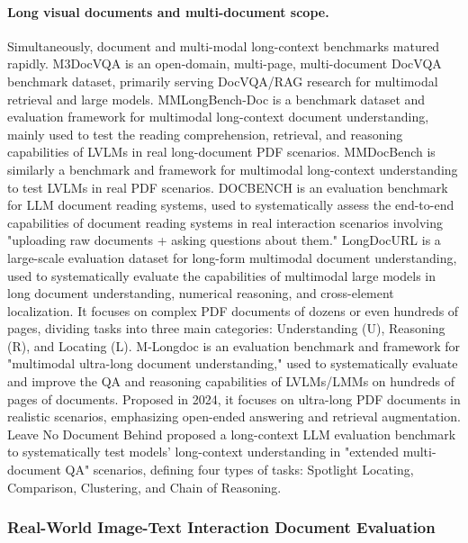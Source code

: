 \paragraph{Long visual documents and multi-document scope.}
Simultaneously, document and multi-modal long-context benchmarks matured rapidly. M3DocVQA \cite{m3docvqa2024} is an open-domain, multi-page, multi-document DocVQA benchmark dataset, primarily serving DocVQA/RAG research for multimodal retrieval and large models. MMLongBench-Doc \cite{mmlongbenchdoc2024} is a benchmark dataset and evaluation framework for multimodal long-context document understanding, mainly used to test the reading comprehension, retrieval, and reasoning capabilities of LVLMs in real long-document PDF scenarios. MMDocBench \cite{mmdocbench2024} is similarly a benchmark and framework for multimodal long-context understanding to test LVLMs in real PDF scenarios. DOCBENCH \cite{docbench2024} is an evaluation benchmark for LLM document reading systems, used to systematically assess the end-to-end capabilities of document reading systems in real interaction scenarios involving "uploading raw documents + asking questions about them." LongDocURL \cite{longdocurl2024} is a large-scale evaluation dataset for long-form multimodal document understanding, used to systematically evaluate the capabilities of multimodal large models in long document understanding, numerical reasoning, and cross-element localization. It focuses on complex PDF documents of dozens or even hundreds of pages, dividing tasks into three main categories: Understanding (U), Reasoning (R), and Locating (L). M-Longdoc \cite{mlongdoc2024} is an evaluation benchmark and framework for "multimodal ultra-long document understanding," used to systematically evaluate and improve the QA and reasoning capabilities of LVLMs/LMMs on hundreds of pages of documents. Proposed in 2024, it focuses on ultra-long PDF documents in realistic scenarios, emphasizing open-ended answering and retrieval augmentation. Leave No Document Behind \cite{leavenodocumentbehind2024} proposed a long-context LLM evaluation benchmark to systematically test models' long-context understanding in "extended multi-document QA" scenarios, defining four types of tasks: Spotlight Locating, Comparison, Clustering, and Chain of Reasoning.

\subsubsection{Real-World Image-Text Interaction Document Evaluation}

